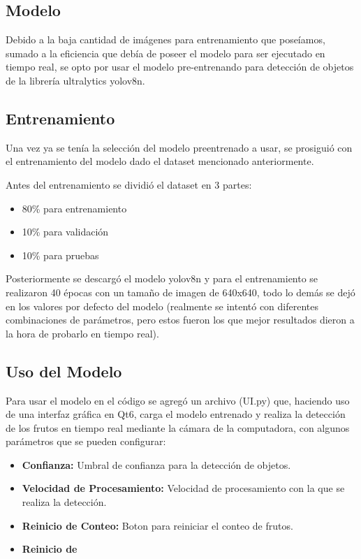 \documentclass[conference]{IEEEtran}
\begin{document}
\subsection{Modelo}
Debido a la baja cantidad de imágenes para entrenamiento que poseíamos, sumado a la eficiencia que debía de poseer el modelo para ser ejecutado en tiempo real, se opto por usar el modelo pre-entrenando para detección de objetos de la librería ultralytics\cite{ultralyticsPackage} yolov8n\cite{ultralyticsYOLOv8}.

\subsection{Entrenamiento}
Una vez ya se tenía la selección del modelo preentrenado a usar, se prosiguió con el entrenamiento del modelo dado el dataset mencionado anteriormente\cite{roboflowLittleFruit}.

Antes del entrenamiento se dividió el dataset en 3 partes:
\begin{itemize}
    \item 80\% para entrenamiento
    \item 10\% para validación
    \item 10\% para pruebas
\end{itemize}

Posteriormente se descargó el modelo yolov8n\cite{ultralyticsYOLOv8} y para el entrenamiento se realizaron 40 épocas con un tamaño de imagen de 640x640, todo lo demás se dejó en los valores por defecto del modelo (realmente se intentó con diferentes combinaciones de parámetros, pero estos fueron los que mejor resultados dieron a la hora de probarlo en tiempo real).

\subsection{Uso del Modelo}
Para usar el modelo en el código se agregó un archivo (UI.py) que, haciendo uso de una interfaz gráfica en Qt6, carga el modelo entrenado y realiza la detección de los frutos en tiempo real mediante la cámara de la computadora, con algunos parámetros que se pueden configurar:

\begin{itemize}
    \item \textbf{Confianza:} Umbral de confianza para la detección de objetos.
    \item \textbf{Velocidad de Procesamiento:} Velocidad de procesamiento con la que se realiza la detección.
    \item \textbf{Reinicio de Conteo:} Boton para reiniciar el conteo de frutos.
    \item \textbf{Reinicio de }
\end{itemize}
\end{document}
